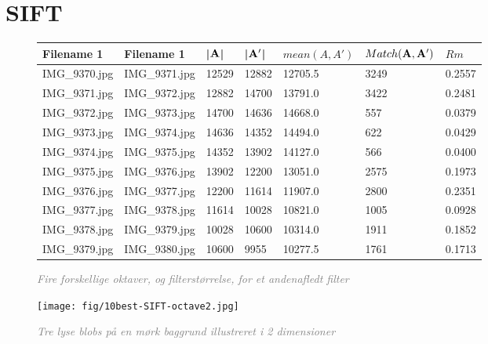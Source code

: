 \section{SIFT}
\begin{figure}[H]
    \centering
    \begin{center}    
    \begin{tabular}{ | l | l | l | l | l | l | l |}
    \hline
    Filename 1 & Filename 1 & |$\bold{A}$| & |$\bold{A'}$| & $mean(A,A')$ & $Match(\bold{A}, \bold{A}')$ & $Rm$ \\ \hline
IMG\_9370.jpg &	IMG\_9371.jpg &	12529 &	12882 &	12705.5 &	3249 &	0.2557\\ \hline
IMG\_9371.jpg &	IMG\_9372.jpg &	12882 &	14700 &	13791.0 &	3422 &	0.2481\\ \hline
IMG\_9372.jpg &	IMG\_9373.jpg &	14700 &	14636 &	14668.0 &	557 &	0.0379\\ \hline
IMG\_9373.jpg &	IMG\_9374.jpg &	14636 &	14352 &	14494.0 &	622 &	0.0429\\ \hline
IMG\_9374.jpg &	IMG\_9375.jpg &	14352 &	13902 &	14127.0 &	566 &	0.0400\\ \hline
IMG\_9375.jpg &	IMG\_9376.jpg &	13902 &	12200 &	13051.0 &	2575 &	0.1973\\ \hline
IMG\_9376.jpg &	IMG\_9377.jpg &	12200 &	11614 &	11907.0 &	2800 &	0.2351\\ \hline
IMG\_9377.jpg &	IMG\_9378.jpg &	11614 &	10028 &	10821.0 &	1005 &	0.0928\\ \hline
IMG\_9378.jpg &	IMG\_9379.jpg &	10028 &	10600 &	10314.0 &	1911 &	0.1852\\ \hline
IMG\_9379.jpg &	IMG\_9380.jpg &	10600 &	9955 &	10277.5 &	1761 &	0.1713\\ \hline
    \end{tabular}       
    \caption{\textcolor{gray}{\footnotesize \textit{Fire forskellige oktaver, og filterstørrelse, for et andenafledt filter}}}
    \label{tab:SIFTOCTAVE3}
     \end{center}
     \vspace{-2.5em}
\end{figure} \noindent

\begin{figure}[H]
    \centering
    \texttt{[image: fig/10best-SIFT-octave2.jpg]}
    \vspace{-0.5em}   
    \begin{center}
    \caption{\textcolor{gray}{\footnotesize \textit{
    Tre lyse blobs på en mørk baggrund illustreret i 2 dimensioner \cite{blob}}}}
    \label{fig:lindblob}
     \end{center}
  \end{figure}
       \vspace{-2.7em}
\noindent




